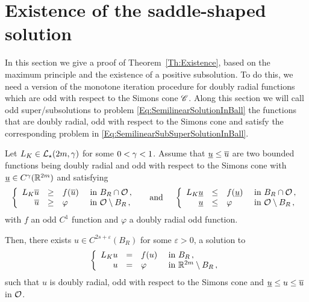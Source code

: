 \section{Existence of the saddle-shaped solution}
\label{Sec:Existence}


In this section we give a proof of Theorem~\ref{Th:Existence}, based on the maximum principle and the existence of a positive subsolution. To do this, we need a version of the monotone iteration procedure for doubly radial functions which are odd with respect to the Simons cone $\mathscr{C}$. Along this section we will call odd super/subsolutions to problem \eqref{Eq:SemilinearSolutionInBall} the functions that are doubly radial, odd with respect to the Simons cone and satisfy the corresponding problem in \eqref{Eq:SemilinearSubSuperSolutionInBall}.

\begin{proposition}
	\label{Prop:MonotoneIterationOdd}
	Let $L_K\in \mathcal{L}_\star(2m,\gamma)$ for some $0<\gamma<1$. Assume that $\underline{u} \leq \overline{u}$ are two bounded functions being doubly radial and odd with respect to the Simons cone with $\underline{u}\in C^\gamma(\mathbb{R}^{2m})$ and satisfying   
	\begin{equation}
	\label{Eq:SemilinearSubSuperSolutionInBall}
	\left\{\begin{array}{rcll}
	L_K\overline{u} & \geq & f(\overline{u}) & \textrm{ in } B_R \cap \mathcal{O}\,, \\
	\overline{u} & \geq & \varphi & \textrm{ in } \mathcal{O} \setminus B_R\,, 
	\end{array} \right.
	\quad \textrm{ and } \quad 
	\left\{\begin{array}{rcll}
	L_K\underline{u} & \leq & f(\underline{u}) & \textrm{ in } B_R \cap \mathcal{O}\,, \\
	\underline{u} & \leq & \varphi & \textrm{ in } \mathcal{O} \setminus B_R\,, 
	\end{array} \right.
	\end{equation}
	with $f$ an odd $C^1$ function and $\varphi$ a doubly radial odd function.
	
	Then, there exists $u\in C^{2s+\varepsilon}(B_R)$ for some $\varepsilon>0$, a solution to
	\begin{equation}
	\label{Eq:SemilinearSolutionInBall}
	\left\{\begin{array}{rcll}
	L_K u & = & f(u) & \textrm{ in } B_R\,, \\
	u &=& \varphi &  \textrm{ in } \mathbb{R}^{2m} \setminus B_R\,, 
	\end{array} \right.
	\end{equation}
	such that $u$ is doubly radial, odd with respect to the Simons cone and  $\underline{u} \leq u \leq \overline{u}$ in $\mathcal{O}$.
\end{proposition}


